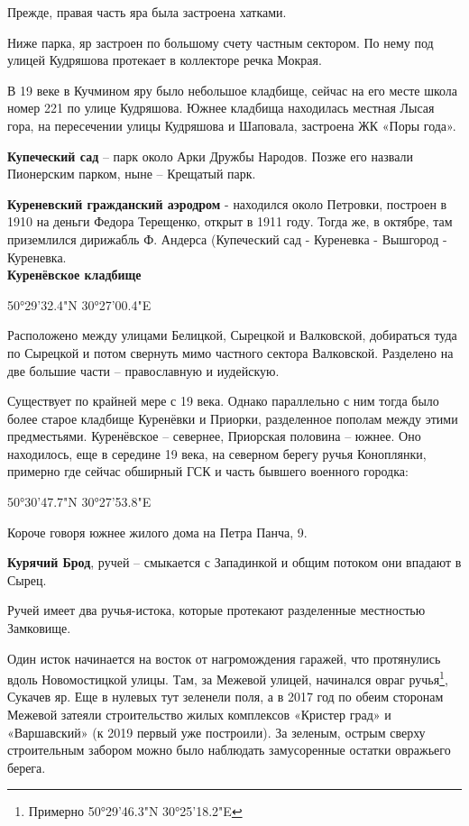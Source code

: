 Прежде, правая часть яра была застроена хатками.

Ниже парка, яр застроен по большому счету частным сектором. По нему под улицей Кудряшова протекает в коллекторе речка Мокрая. 

В 19 веке в Кучмином яру было небольшое кладбище, сейчас на его месте школа номер 221 по улице Кудряшова. Южнее кладбища находилась местная Лысая гора, на пересечении улицы Кудряшова и Шаповала, застроена ЖК «Поры года».\\


\medskip

\textbf{Купеческий сад} – парк около Арки Дружбы Народов. Позже его назвали Пионерским парком, ныне – Крещатый парк.\\

\medskip

\textbf{Куреневский гражданский аэродром} - находился около Петровки, построен в 1910 на деньги Федора Терещенко, открыт в 1911 году. Тогда же, в октябре, там приземлился дирижабль Ф. Андерса (Купеческий сад - Куреневка - Вышгород - Куреневка.\\ 

\textbf{Куренёвское кладбище} 

50°29'32.4"N 30°27'00.4"E

Расположено между улицами Белицкой, Сырецкой и Валковской, добираться туда по Сырецкой и потом свернуть мимо частного сектора Валковской. Разделено на две большие части – православную и иудейскую. 

Существует по крайней мере с 19 века. Однако параллельно с ним тогда было более старое кладбище Куренёвки и Приорки, разделенное пополам между этими предместьями. Куренёвское – севернее, Приорская половина – южнее. Оно находилось, еще в середине 19 века, на северном берегу ручья Коноплянки, примерно где сейчас обширный ГСК и часть бывшего военного городка:

50°30'47.7"N 30°27'53.8"E

Короче говоря южнее жилого дома на Петра Панча, 9.\\

\medskip


\textbf{Курячий Брод}, ручей – смыкается с Западинкой и общим потоком они впадают в Сырец.

Ручей имеет два ручья-истока, которые протекают разделенные местностью Замковище. 

Один исток начинается на восток от нагромождения гаражей, что протянулись вдоль Новомостицкой улицы. Там, за Межевой улицей, начинался овраг ручья\footnote{Примерно 50°29'46.3"N 30°25'18.2"E}, Сукачев яр. Еще в нулевых тут зеленели поля, а в 2017 год по обеим сторонам Межевой затеяли строительство жилых комплексов «Кристер град» и «Варшавский» (к 2019 первый уже построили). За зеленым, острым сверху строительным забором можно было наблюдать замусоренные остатки овражьего берега.

